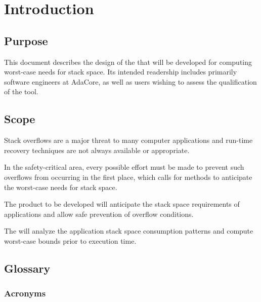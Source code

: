 \chapter{Introduction}\label{ch:introduction}
\section{Purpose}

This document describes the design of the \ssat{} that will be
developed for computing worst-case needs for stack space. Its intended
readership includes primarily software engineers at AdaCore, as well
as users wishing to assess the qualification of the tool.

\section{Scope}

Stack overflows are a major threat to many computer applications and
run-time recovery techniques are not always available or appropriate.

In the safety-critical area, every possible effort must be made to
prevent such overflows from occurring in the first place, which calls
for methods to anticipate the worst-case needs for stack space.

The product to be developed will anticipate the stack space
requirements of applications and allow safe prevention of
overflow conditions.

The \ssat{} will analyze the application stack space consumption patterns
and compute worst-case bounds prior to execution time.

\section{Glossary}

\subsection{Acronyms}

